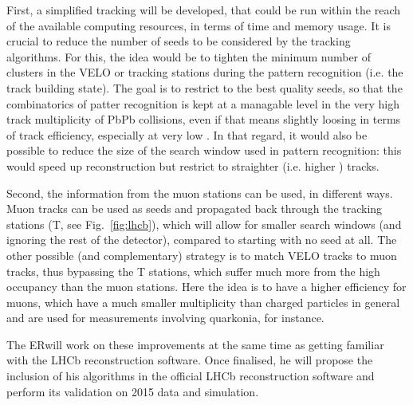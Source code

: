 \documentclass[a4paper,11pt]{article}
\newcommand{\ER}{ER}
\begin{document}
First, a simplified tracking will be developed, that could be run within the reach of the available computing resources, in terms of time and memory usage. It is crucial to reduce the number of seeds to be considered by the tracking algorithms. For this, the idea would be to tighten the minimum number of clusters in 
the VELO or tracking stations during the pattern recognition (i.e. the track building state). 
The goal is to restrict to the best quality seeds, so that the combinatorics of patter recognition is kept at a managable level in the very high track multiplicity of PbPb collisions, even if that means slightly loosing in terms of track efficiency, especially at very low \pt. In that regard, it would also be possible to reduce the size of the search window used in pattern recognition: this would speed up reconstruction but restrict to straighter (i.e. higher \pt) tracks.

Second, the information from the muon stations can be used, in different ways. Muon tracks can be used as seeds and propagated back through the tracking stations (T, see Fig.~\ref{fig:lhcb}), which will allow for smaller search windows (and ignoring the rest of the detector), compared to starting with no seed at all. The other possible (and complementary) strategy is to match VELO tracks to muon tracks, thus bypassing the T stations, which suffer much more from the high occupancy than the muon stations. Here the idea is to have a higher efficiency for muons, which have a much smaller multiplicity than charged particles in general and are used for measurements involving quarkonia, for instance. 

The \ER will work on these improvements at the same time as getting familiar with the LHCb reconstruction software. Once finalised, he will propose the inclusion of his algorithms in the official LHCb reconstruction software and perform its validation on 2015 \pbpb data and simulation.
\end{document}
